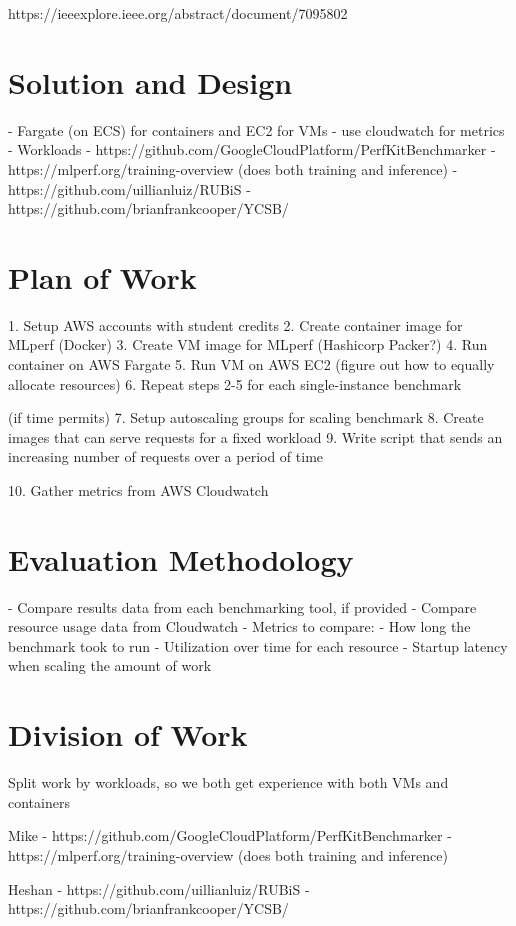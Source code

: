 \documentclass[11pt]{article}
\begin{document}
https://ieeexplore.ieee.org/abstract/document/7095802

\section{Solution and Design}

- Fargate (on ECS) for containers and EC2 for VMs
- use cloudwatch for metrics
- Workloads
  - https://github.com/GoogleCloudPlatform/PerfKitBenchmarker
  - https://mlperf.org/training-overview (does both training and inference)
  - https://github.com/uillianluiz/RUBiS
  - https://github.com/brianfrankcooper/YCSB/


\section{Plan of Work}


1. Setup AWS accounts with student credits
2. Create container image for MLperf (Docker)
3. Create VM image for MLperf (Hashicorp Packer?)
4. Run container on AWS Fargate
5. Run VM on AWS EC2 (figure out how to equally allocate resources)
6. Repeat steps 2-5 for each single-instance benchmark

(if time permits)
7. Setup autoscaling groups for scaling benchmark
8. Create images that can serve requests for a fixed workload
9. Write script that sends an increasing number of requests over a period of time

10. Gather metrics from AWS Cloudwatch

\section{Evaluation Methodology}

- Compare results data from each benchmarking tool, if provided
- Compare resource usage data from Cloudwatch
- Metrics to compare:
  - How long the benchmark took to run
  - Utilization over time for each resource
  - Startup latency when scaling the amount of work

\section{Division of Work}

Split work by workloads, so we both get experience with both VMs and containers

Mike
  - https://github.com/GoogleCloudPlatform/PerfKitBenchmarker
  - https://mlperf.org/training-overview (does both training and inference)

Heshan
  - https://github.com/uillianluiz/RUBiS
  - https://github.com/brianfrankcooper/YCSB/
\end{document}
